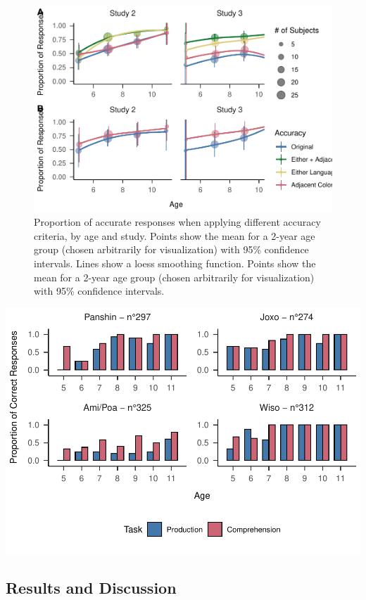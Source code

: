 \documentclass[
  english,
  ,man,floatsintext]{apa6}
\begin{document}
\begin{figure}
\centering
\includegraphics{amazon_color_files/figure-latex/study23-accuracy-1.pdf}
\caption{\label{fig:study23-accuracy}Proportion of accurate responses when applying different accuracy criteria, by age and study. Points show the mean for a 2-year age group (chosen arbitrarily for visualization) with 95\% confidence intervals. Lines show a loess smoothing function. Points show the mean for a 2-year age group (chosen arbitrarily for visualization) with 95\% confidence intervals.}
\end{figure}

\includegraphics{amazon_color_files/figure-latex/study2-task-compare-plot-1.pdf}

\hypertarget{results-and-discussion-1}{%
\subsection{Results and Discussion}\label{results-and-discussion-1}}
\end{document}
